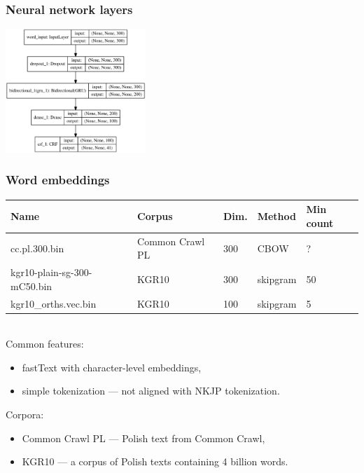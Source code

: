 \documentclass[Warsaw]{beamer}
\begin{document}

\begin{frame}
    \frametitle{Neural network layers}
    \centering
    \includegraphics[width=200px]{model.eps}
\end{frame}


\begin{frame}
    \frametitle{Word embeddings}
    \scriptsize
    \begin{tabular}{l|l|l|l|l}
        \textbf{Name} & \textbf{Corpus} & \textbf{Dim.} & \textbf{Method} & \textbf{Min count} \\
        \hline
        cc.pl.300.bin               & Common Crawl PL & 300 & CBOW     & ? \\
        kgr10-plain-sg-300-mC50.bin & KGR10           & 300 & skipgram & 50\\
        kgr10\_orths.vec.bin        & KGR10           & 100 & skipgram & 5\\
    \end{tabular}
    \vspace{1em}\\
    Common features:
    \begin{itemize}
        \item fastText with character-level embeddings,
        \item simple tokenization --- not aligned with NKJP tokenization.
    \end{itemize}
    Corpora:
    \begin{itemize}
        \item Common Crawl PL --- Polish text from Common Crawl,
        \item KGR10 --- a corpus of Polish texts containing 4 billion words.
    \end{itemize}
\end{frame}

\end{document}
